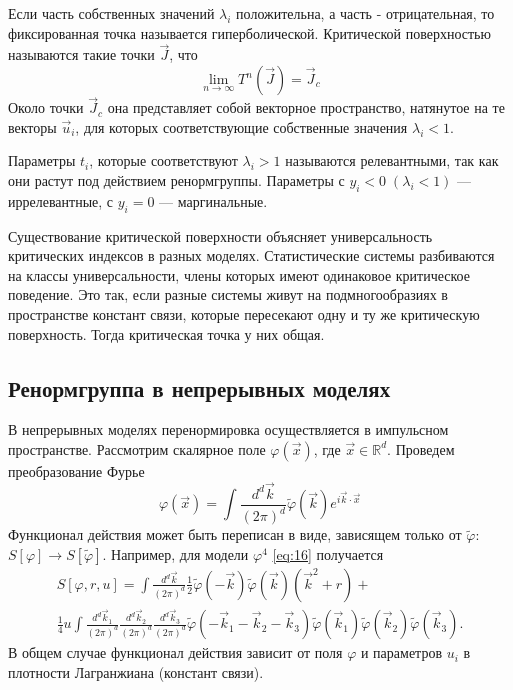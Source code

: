 \documentclass[a4paper,12pt]{article}
\theoremstyle{definition}
\theoremstyle{definition}
\theoremstyle{definition}
\begin{document}
Если часть собственных значений $\lambda_i$ положительна, а часть - отрицательная, то фиксированная точка называется гиперболической. 
Критической поверхностью называются такие точки $\vec J$, что
\begin{equation}
  \label{eq:63}
  \lim_{n\to \infty}T^n (\vec J)=\vec J_c
\end{equation}
Около точки $\vec J_c$ она представляет собой векторное пространство, натянутое на те векторы $\vec u_i$, для которых соответствующие собственные значения $\lambda_i<1$. 

Параметры $t_i$, которые соответствуют $\lambda_i>1$ называются релевантными, так как они растут под действием ренормгруппы. Параметры с $y_i<0 \; (\lambda_i<1)$ --- иррелевантные, с $y_i=0$ --- маргинальные.

Существование критической поверхности объясняет универсальность критических индексов в разных моделях. Статистические системы разбиваются на классы универсальности, члены которых имеют одинаковое критическое поведение. Это так, если разные системы живут на подмногообразиях в пространстве констант связи, которые пересекают одну и ту же критическую поверхность. Тогда критическая точка у них общая.

\subsection{Ренормгруппа в непрерывных моделях}
\label{sec:renormgroup-general}
В непрерывных моделях перенормировка осуществляется в импульсном пространстве. Рассмотрим скалярное поле $\varphi(\vec x)$, где $\vec x\in \mathbb{R}^d$. Проведем преобразование Фурье
\begin{equation}
  \label{eq:64}
  \varphi(\vec x)=\int \frac{d^d \vec k}{(2\pi)^d}\tilde \varphi(\vec k) e^{i\vec k\cdot \vec x}
\end{equation}
Функционал действия может быть переписан в виде, зависящем только от $\tilde\varphi$: $S[\varphi]\to S[\tilde\varphi]$. Например, для модели $\varphi^4$ \eqref{eq:16} получается
\begin{multline}
  \label{eq:65}
  S[\varphi,r,u]=\int  \frac{d^d \vec k}{(2\pi)^d} \frac{1}{2} \tilde\varphi(-\vec k)\tilde\varphi(\vec k)(\vec k^2+r)+\\
  \frac{1}{4}u\int  \frac{d^d \vec k_1}{(2\pi)^d} \frac{d^d \vec k_2}{(2\pi)^d} \frac{d^d \vec k_3}{(2\pi)^d} \tilde\varphi(-\vec k_1-\vec k_2 -\vec k_3)\tilde \varphi(\vec k_1)\tilde\varphi (\vec k_2)\tilde\varphi(\vec k_3).
\end{multline}
В общем случае функционал действия зависит от поля $\varphi$ и параметров $u_i$ в плотности Лагранжиана (констант связи).
\end{document}
